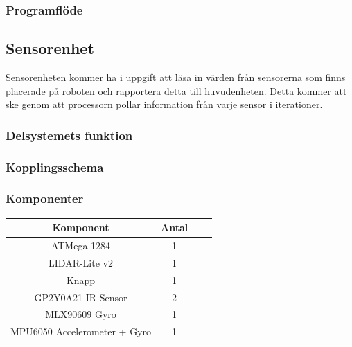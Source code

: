 \documentclass{article}
\begin{document}
\subsubsection{Programflöde}


\clearpage

\subsection{Sensorenhet}
Sensorenheten kommer ha i uppgift att läsa in värden från sensorerna som finns placerade på roboten och rapportera detta till huvudenheten. Detta kommer att ske genom att processorn pollar information från varje sensor i iterationer.

\subsubsection{Delsystemets funktion}

\subsubsection{Kopplingsschema}

\subsubsection{Komponenter}

\begin{table}[H]
  \centering
  \begin{tabular}{ | c | c | c | c |}
    \hline
    \textbf{Komponent} & \textbf{Antal} \\
    \hline
    ATMega 1284 & 1 \\
    \hline
    LIDAR-Lite v2 & 1 \\
    \hline
    Knapp & 1 \\
    \hline
    GP2Y0A21 IR-Sensor & 2 \\
    \hline
    MLX90609 Gyro & 1 \\
    \hline
    MPU6050 Accelerometer + Gyro & 1 \\
    \hline
  \end{tabular}
\end{table}
\end{document}
